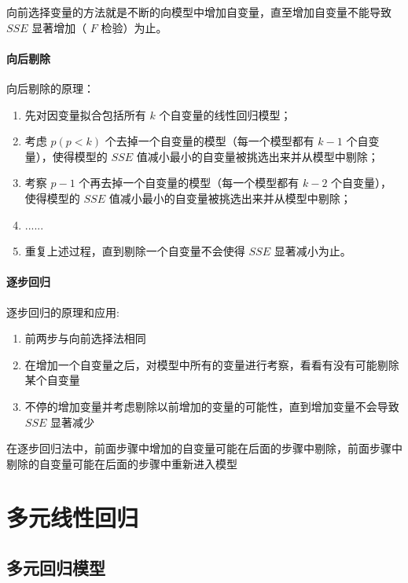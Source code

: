 \documentclass[UTF8,10pt]{book}
\begin{document}
{向前选择变量的方法就是不断的向模型中增加自变量，直至增加自变量不能导致
\(SSE\) 显著增加（ \(F\) 检验）为止。

\subsubsection{向后剔除}\label{header-n301}

向后剔除的原理：

\begin{enumerate}
	\def\labelenumi{\arabic{enumi}.}
	\item
	先对因变量拟合包括所有 \(k\) 个自变量的线性回归模型；
	\item
	考虑 \(p(p<k)\) 个去掉一个自变量的模型（每一个模型都有 \(k-1\)
	个自变量），使得模型的 \(SSE\)
	值减小最小的自变量被挑选出来并从模型中剔除；
	\item
	考察 \(p-1\) 个再去掉一个自变量的模型（每一个模型都有 \(k-2\)
	个自变量），使得模型的 \(SSE\)
	值减小最小的自变量被挑选出来并从模型中剔除；
	\item
	......
	\item
	重复上述过程，直到剔除一个自变量不会使得 \(SSE\) 显著减小为止。
\end{enumerate}

\subsubsection{逐步回归}\label{header-n314}

逐步回归的原理和应用:

\begin{enumerate}
	\def\labelenumi{\arabic{enumi}.}
	\item
	前两步与向前选择法相同
	\item
	在增加一个自变量之后，对模型中所有的变量进行考察，看看有没有可能剔除某个自变量
	\item
	不停的增加变量并考虑剔除以前增加的变量的可能性，直到增加变量不会导致
	\(SSE\) 显著减少
\end{enumerate}

在逐步回归法中，前面步骤中增加的自变量可能在后面的步骤中剔除，前面步骤中剔除的自变量可能在后面的步骤中重新进入模型
\clearpage

\chapter{多元线性回归}


\section{多元回归模型}
}
\end{document}
